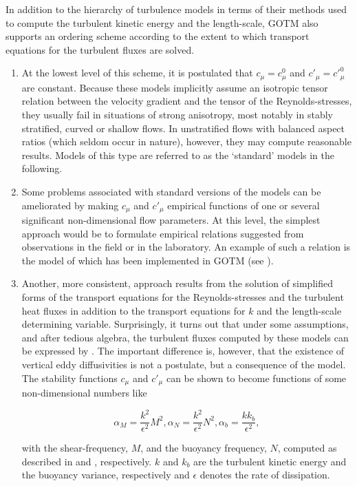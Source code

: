 In addition to the hierarchy of turbulence models in terms of their
methods used to compute the turbulent kinetic energy and the
length-scale, GOTM also supports an ordering scheme according to the
extent to which transport equations for the turbulent fluxes are solved.
\begin{enumerate}
\item At the lowest level of this scheme, it is postulated that
 $c_\mu=c_\mu^0$ and $c'_\mu=c'^0_\mu$ are constant. Because these
 models implicitly assume an isotropic tensor relation between the velocity
 gradient and the tensor of the Reynolds-stresses, they usually fail
 in situations of strong anisotropy, most notably in stably
 stratified, curved or shallow flows. In unstratified flows with
 balanced aspect ratios (which seldom occur in nature), however, they
 may compute reasonable results. Models of this type are referred to
 as the `standard' models in the following.
\item Some problems associated with standard versions of the models can
 be ameliorated by making $c_\mu$ and $c'_\mu$ empirical functions of
 one or several significant non-dimensional flow parameters. At this
 level, the simplest approach would be to formulate empirical
 relations suggested from observations in the field or in the
 laboratory. An example of such a relation is the model of
 \cite{SchumannGerz95} which has been implemented in GOTM (see
 ).
\item Another, more consistent, approach results from the solution of 
 simplified forms of the transport equations for the Reynolds-stresses
 and the turbulent heat fluxes in addition to the transport equations
 for $k$ and the length-scale determining variable.  Surprisingly, it
 turns out that under some assumptions, and after tedious algebra, the
 turbulent fluxes computed by these models can be expressed by
 . The important difference is, however, that the existence of
 vertical eddy diffusivities is not a postulate, but a consequence
 of the model. The stability functions $c_\mu$ and $c'_\mu$ can be
 shown to become functions of some non-dimensional numbers like

 \begin{equation} 
   \label{alphaMN} 
    \alpha_M = \frac{k^2}{\epsilon^2} M^2 \comma 
    \alpha_N = \frac{k^2}{\epsilon^2} N^2 \comma
    \alpha_b = \frac{kk_b}{\epsilon^2}    \comma
 \end{equation}

 with the shear-frequency, $M$, and the buoyancy frequency, $N$,
 computed as described in  and
 , respectively. $k$ and $k_b$ are the
 turbulent kinetic energy and the buoyancy variance, respectively and
 $\epsilon$ denotes the rate of dissipation.


\end{enumerate}
